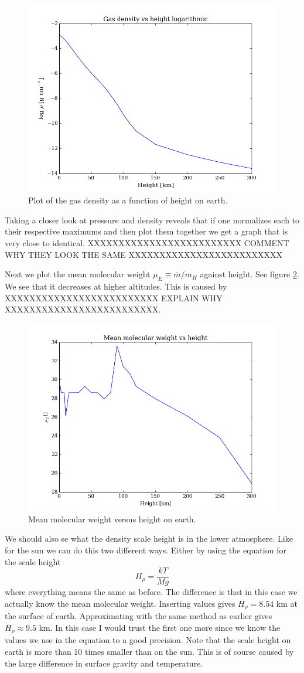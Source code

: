 \documentclass{aa}   %
\begin{document}
\begin{figure}
 \includegraphics[width=.49\textwidth]{gas_dens_earth.png}
 \caption{Plot of the gas density as a function of height on earth.}
 \label{gas_dens_earth} 
\end{figure}

Taking a closer look at pressure and density reveals that if one normalizes each to their respective maximums and then plot them together we get a graph that is very close to identical.
XXXXXXXXXXXXXXXXXXXXXXXXX COMMENT WHY THEY LOOK THE SAME XXXXXXXXXXXXXXXXXXXXXXXXX

Next we plot the mean molecular weight $\mu_E \equiv \overline{m}/m_H$ against height. See figure \ref{mu_E}. We see that it decreases at higher altitudes. This is caused by XXXXXXXXXXXXXXXXXXXXXXXXX EXPLAIN WHY XXXXXXXXXXXXXXXXXXXXXXXXX.
\begin{figure}
 \includegraphics[width=.49\textwidth]{mu_E.png}
 \caption{Mean molecular weight versus height on earth.}
 \label{mu_E} 
\end{figure}

We should also se what the density scale height is in the lower atmosphere. Like for the sun we can do this two different ways. Either by using the equation for the scale height
\begin{equation}
 H_\rho = \frac{kT}{Mg}
\end{equation}
where everything means the same as before. The difference is that in this case we actually know the mean molecular weight. Inserting values gives $H_\rho = 8.54$ km at the surface of earth. Approximating with the same method as earlier gives $H_\rho \approx 9.5$ km. In this case I would trust the first one more since we know the values we use in the equation to a good precision. Note that the scale height on earth is more than 10 times smaller than on the sun. This is of course caused by the large difference in surface gravity and temperature.
\end{document}
